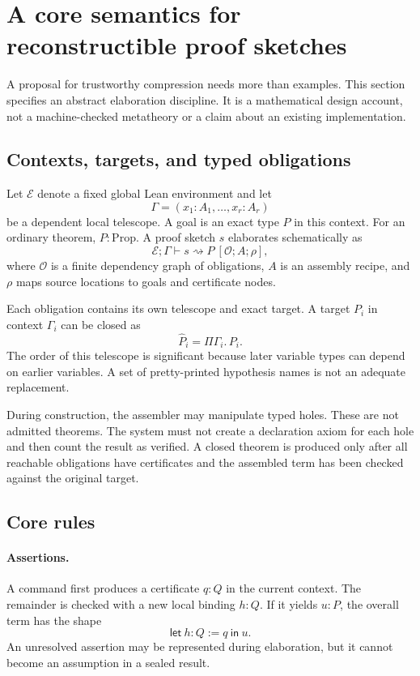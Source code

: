 \documentclass[11pt,a4paper]{article}
\newcommand{\code}[1]{\texttt{\detokenize{#1}}}
\newcommand{\E}{\mathcal E}
\newcommand{\Ob}{\mathcal O}
\theoremstyle{remark}
\begin{document}
\section{A core semantics for reconstructible proof sketches}
\label{sec:semantics}
A proposal for trustworthy compression needs more than examples. This section specifies an abstract elaboration discipline. It is a mathematical design account, not a machine-checked metatheory or a claim about an existing implementation.

\subsection{Contexts, targets, and typed obligations}
Let $\E$ denote a fixed global Lean environment and let
\[
\Gamma=(x_1:A_1,\ldots,x_r:A_r)
\]
be a dependent local telescope. A goal is an exact type $P$ in this context. For an ordinary theorem, $P:\mathrm{Prop}$. A proof sketch $s$ elaborates schematically as
\begin{equation}
\E;\Gamma\vdash s\rightsquigarrow P\ [\Ob;A;\rho],
\label{eq:elabjudgment}
\end{equation}
where $\Ob$ is a finite dependency graph of obligations, $A$ is an assembly recipe, and $\rho$ maps source locations to goals and certificate nodes.

Each obligation contains its own telescope and exact target. A target $P_i$ in context $\Gamma_i$ can be closed as
\[
\widehat P_i=\Pi\Gamma_i.\,P_i.
\]
The order of this telescope is significant because later variable types can depend on earlier variables. A set of pretty-printed hypothesis names is not an adequate replacement.

During construction, the assembler may manipulate typed holes. These are not admitted theorems. The system must not create a declaration axiom for each hole and then count the result as verified. A closed theorem is produced only after all reachable obligations have certificates and the assembled term has been checked against the original target.

\subsection{Core rules}
\paragraph{Assertions.}
A command \code{have h : Q by r} first produces a certificate $q:Q$ in the current context. The remainder is checked with a new local binding $h:Q$. If it yields $u:P$, the overall term has the shape
\[
\mathsf{let}\ h:Q:=q\ \mathsf{in}\ u.
\]
An unresolved assertion may be represented during elaboration, but it cannot become an assumption in a sealed result.
\end{document}
